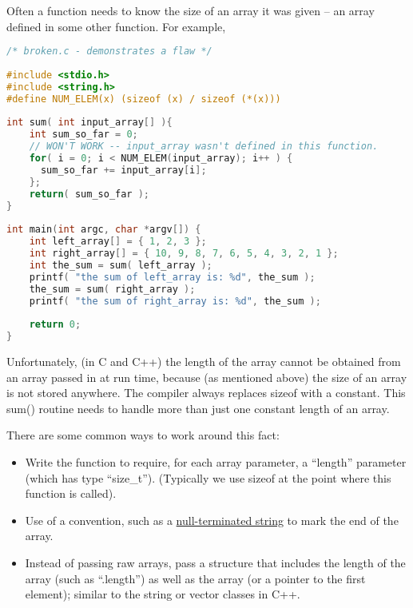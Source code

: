 Often a function needs to know the size of an array it was given -- an array
defined in some other function.
For example,
\lstset{basicstyle=\scriptsize, numbers=left, captionpos=b, tabsize=4}
\begin{lstlisting}[caption=Section \thesection listing \arabic{pntcnt},language={C},
breaklines=true,xleftmargin=15pt,label=lst:section\thesection listing\arabic{pntcnt}]
/* broken.c - demonstrates a flaw */
 
#include <stdio.h>
#include <string.h>
#define NUM_ELEM(x) (sizeof (x) / sizeof (*(x)))
 
int sum( int input_array[] ){
	int sum_so_far = 0;
	// WON'T WORK -- input_array wasn't defined in this function.
	for( i = 0; i < NUM_ELEM(input_array); i++ ) {
	  sum_so_far += input_array[i];
	};
	return( sum_so_far );
}
 
int main(int argc, char *argv[]) {
	int left_array[] = { 1, 2, 3 };
	int right_array[] = { 10, 9, 8, 7, 6, 5, 4, 3, 2, 1 };
	int the_sum = sum( left_array );
	printf( "the sum of left_array is: %d", the_sum );
	the_sum = sum( right_array );
	printf( "the sum of right_array is: %d", the_sum );
	
	return 0;
}
\end{lstlisting}

Unfortunately, (in C and C++) the length of the array cannot be obtained from
an array passed in at run time, because (as mentioned above) the size of an
array is not stored anywhere.  The compiler always replaces sizeof with a
constant.  This sum() routine needs to handle more than just one constant
length of an array.

There are some common ways to work around this fact:
\begin{itemize}
	\item Write the function to require, for each array parameter, a ``length''
parameter (which has type ``size\_t''). (Typically we use sizeof at the point
where this function is called).
	\item Use of a convention, such as a
\href{http://en.wikipedia.org/wiki/null-terminated_string}{null-terminated
string} to mark the end of the array.
	\item Instead of passing raw arrays, pass a structure that includes the
length of the array (such as ``.length'') as well as the array (or a pointer to
the first element); similar to the string or vector classes in C++.
\end{itemize}

